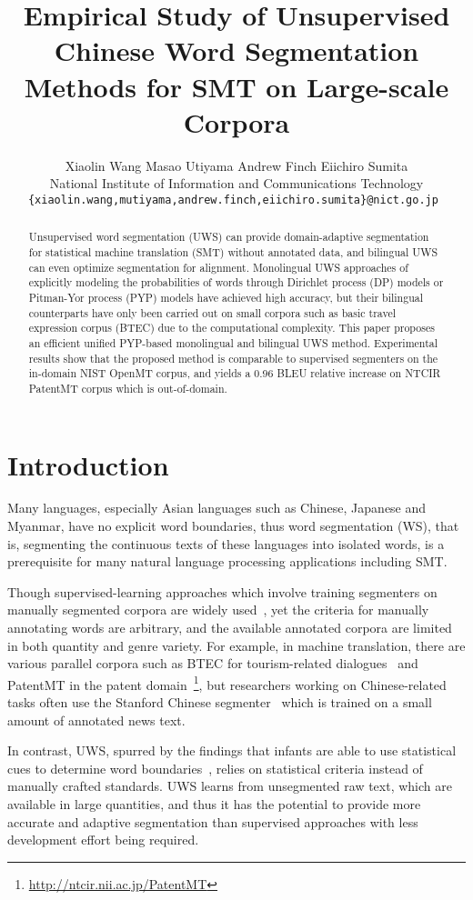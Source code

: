\documentclass[11pt]{article}
\title{Empirical Study of Unsupervised Chinese Word Segmentation Methods for SMT on Large-scale Corpora}
\author{Xiaolin Wang \hspace{.7cm} Masao Utiyama \hspace{.7cm} Andrew Finch \hspace{.7cm} Eiichiro Sumita \\
National Institute of Information and Communications Technology \\
{\tt \{xiaolin.wang,mutiyama,andrew.finch,eiichiro.sumita\}@nict.go.jp } \\}
\date{}
\begin{document}
\maketitle
\begin{abstract}

Unsupervised word segmentation (UWS) can provide domain-adaptive segmentation for statistical machine translation (SMT) without annotated data, and bilingual UWS can even optimize segmentation for alignment. Monolingual UWS approaches of explicitly modeling the probabilities of words through Dirichlet process (DP) models or Pitman-Yor process (PYP) models have achieved high accuracy, but their bilingual counterparts have only been carried out on small corpora such as basic travel expression corpus (BTEC) due to the computational complexity.  This paper proposes an efficient unified PYP-based monolingual and bilingual UWS method. Experimental results show that the proposed method is comparable to supervised segmenters on the in-domain NIST OpenMT corpus, and yields a 0.96 BLEU relative increase on NTCIR PatentMT corpus which is out-of-domain.
\end{abstract}



\section{Introduction}

Many languages, especially Asian languages such as Chinese, Japanese and
Myanmar, have no explicit word boundaries, thus word segmentation (WS),
that is, segmenting the continuous texts of these languages into
isolated words, is a prerequisite for many natural language processing
applications including SMT.

Though supervised-learning approaches which involve training segmenters on manually segmented corpora are widely used~\cite{chang2008optimizing}, yet the criteria for manually annotating words are arbitrary, and the available annotated corpora are limited in both quantity and genre variety. For example, in machine translation, there
are various parallel corpora such as BTEC for tourism-related
dialogues~\cite{paul2008overview} and PatentMT in the patent 
domain~\cite{goto2011overview}\footnote{\url{http://ntcir.nii.ac.jp/PatentMT}}, 
but researchers working on Chinese-related tasks often use the Stanford Chinese
segmenter~\cite{tseng2005conditional} which is
trained on a small amount of annotated news text.

In contrast, UWS, spurred by the findings that infants are able to use
statistical cues to determine word
boundaries~\cite{saffran1996statistical}, relies on statistical criteria
instead of manually crafted standards.  UWS learns from unsegmented raw
text, which are available in large quantities, and thus it has the potential
to provide more accurate and adaptive segmentation than supervised
approaches with less development effort being required.
\end{document}
